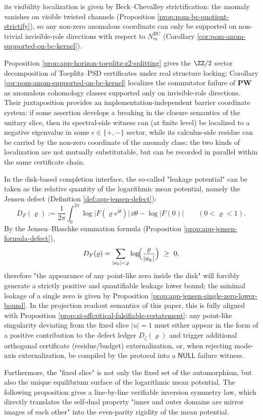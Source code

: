 its visibility localization is given by Beck--Chevalley strictification: the anomaly vanishes on visible twisted channels (Proposition \ref{prop:pom-bc-quotient-strictify}), so any non-zero anomalous coordinate can only be supported on non-trivial invisible-role directions with respect to \(N^{\mathrm{BC}}_m\) (Corollary \ref{cor:pom-anom-supported-on-bc-kernel}).
\begin{remark}\label{rem:xi-toeplitz-z2-anom-alignment}
Proposition \ref{prop:app-horizon-toeplitz-z2-splitting} gives the \(\ZZ/2\) sector decomposition of Toeplitz--PSD certificates under real structure locking;
Corollary \ref{cor:pom-anom-supported-on-bc-kernel} localizes the commutator failure of \(\mathbf{PW}\) as anomalous cohomology classes supported only on invisible-role directions.
Their juxtaposition provides an implementation-independent barrier coordinate system: if some assertion develops a breaking in the closure semantics of the unitary slice, then its spectral-side witness can (at finite level) be localized to a negative eigenvalue in some \(\epsilon\in\{+,-\}\) sector, while its calculus-side residue can be carried by the non-zero coordinate of the anomaly class;
the two kinds of localization are not mutually substitutable, but can be recorded in parallel within the same certificate chain.
\end{remark}
In the disk-based completion interface, the so-called "leakage potential" can be taken as the relative quantity of the logarithmic mean potential, namely the Jensen defect (Definition \ref{def:app-jensen-defect}):
\[
D_F(\varrho)
:=\frac{1}{2\pi}\int_{0}^{2\pi}\log\bigl|F(\varrho e^{\mathrm{i}\theta})\bigr|\,\dd\theta
-\log|F(0)|
\qquad(0<\varrho<1).
\]
By the Jensen--Blaschke summation formula (Proposition \ref{prop:app-jensen-formula-defect}),
\[
D_F(\varrho)=\sum_{|a_k|<\varrho}\log\!\Bigl(\frac{\varrho}{|a_k|}\Bigr)\ \ge\ 0,
\]
therefore "the appearance of any point-like zero inside the disk" will forcibly generate a strictly positive and quantifiable leakage lower bound;
the minimal leakage of a single zero is given by Proposition \ref{prop:app-jensen-single-zero-lower-bound}.
In the projection readout semantics of this paper, this is fully aligned with Proposition \ref{prop:xi-offcritical-falsifiable-restatement}: any point-like singularity deviating from the fixed slice \(|u|=1\) must either appear in the form of a positive contribution to the defect ledger \(D_\zeta(\varrho)\) and trigger additional orthogonal certificate (residue/budget) externalization, or, when rejecting mode-axis externalization, be compiled by the protocol into a \(\mathsf{NULL}\) failure witness.
\par
Furthermore, the "fixed slice" is not only the fixed set of the automorphism, but also the unique equilibrium surface of the logarithmic mean potential.
The following proposition gives a line-by-line verifiable inversion symmetry law, which directly translates the self-dual property "inner and outer domains are mirror images of each other" into the even-parity rigidity of the mean potential.

